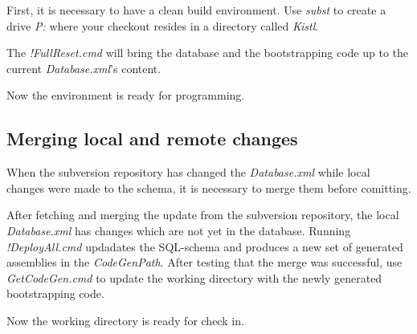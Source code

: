First, it is necessary to have a clean build environment. Use
\emph{subst} to create a drive \emph{P:} where your checkout
resides in a directory called \emph{Kistl}.

The \emph{!FullReset.cmd} will bring the database and the bootstrapping
code up to the current \emph{Database.xml}'s content.

Now the environment is ready for programming.

\subsection{Merging local and remote changes}

When the subversion repository has changed the \emph{Database.xml} while
local changes were made to the schema, it is necessary to merge them
before comitting.

After fetching and merging the update from the subversion repository,
the local \emph{Database.xml} has changes which are not yet in the
database. Running \emph{!DeployAll.cmd} updadates the SQL-schema and
produces a new set of generated assemblies in the \emph{CodeGenPath}.
After testing that the merge was successful, use \emph{GetCodeGen.cmd}
to update the working directory with the newly generated bootstrapping
code.

Now the working directory is ready for check in.



